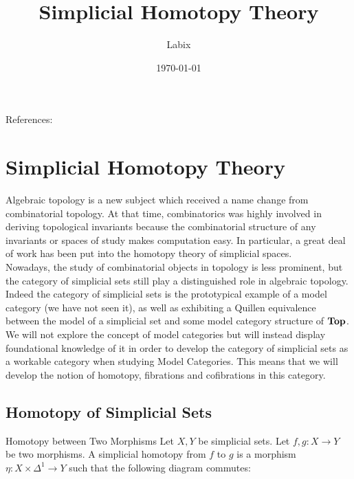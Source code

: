\documentclass[a4paper]{article}
\title{Simplicial Homotopy Theory}
\author{Labix}
\date{\today}
\begin{document}
\maketitle
\begin{abstract}

\end{abstract}
References: 

\pagebreak
\tableofcontents

\pagebreak
\section{Simplicial Homotopy Theory}
Algebraic topology is a new subject which received a name change from combinatorial topology. At that time, combinatorics was highly involved in deriving topological invariants because the combinatorial structure of any invariants or spaces of study makes computation easy. In particular, a great deal of work has been put into the homotopy theory of simplicial spaces. \\

Nowadays, the study of combinatorial objects in topology is less prominent, but the category of simplicial sets still play a distinguished role in algebraic topology. Indeed the category of simplicial sets is the prototypical example of a model category (we have not seen it), as well as exhibiting a Quillen equivalence between the model of a simplicial set and some model category structure of $\bold{Top}$. We will not explore the concept of model categories but will instead display foundational knowledge of it in order to develop the category of simplicial sets as a workable category when studying Model Categories. This means that we will develop the notion of homotopy, fibrations and cofibrations in this category. 

\subsection{Homotopy of Simplicial Sets}
\begin{defn}{Homotopy between Two Morphisms}{} Let $X,Y$ be simplicial sets. Let $f,g:X\to Y$ be two morphisms. A simplicial homotopy from $f$ to $g$ is a morphism $\eta:X\times\Delta^1\to Y$ such that the following diagram commutes: \\~\\
\\~\\
\end{defn}
\end{document}
